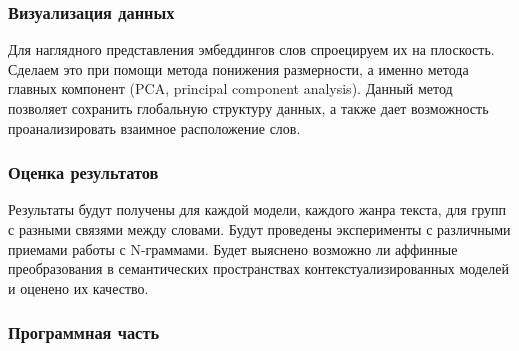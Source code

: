 \documentclass[a4paper,14pt]{article}
\begin{document}

	
\subsubsection{Визуализация данных}

Для наглядного представления эмбеддингов слов спроецируем их на плоскость.
Сделаем это при помощи метода понижения размерности, а именно метода главных компонент (PCA, principal component analysis).
Данный метод позволяет сохранить глобальную структуру данных, а также дает возможность проанализировать взаимное расположение слов.

\subsubsection{Оценка результатов}

Результаты будут получены для каждой модели, каждого жанра текста, для групп с разными связями между словами.
Будут проведены эксперименты с различными приемами работы с N-граммами.
Будет выяснено возможно ли аффинные преобразования в семантических пространствах контекстуализированных моделей и оценено их качество.

\subsubsection{Программная часть}
\end{document}
